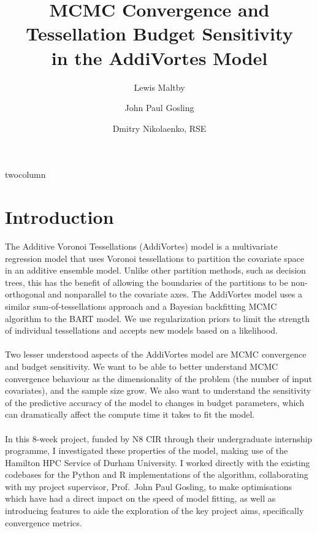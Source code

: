 \documentclass[10pt]{article}
\title{\Large\bfseries MCMC Convergence and Tessellation Budget Sensitivity\\
in the AddiVortes Model}
\author{Lewis Maltby}
\author{John Paul Gosling}
\author{Dmitry Nikolaenko, RSE}
\affil{Durham University, Durham, United Kingdom}
\date{}
\begin{document}
\csname twocolumn\endcsname[
    \begin{@twocolumnfalse}
        \maketitle
    \end{@twocolumnfalse}
]
\section{Introduction}
The Additive Voronoi Tessellations (AddiVortes) model is a multivariate regression model that uses Voronoi tessellations to partition the covariate space in an additive ensemble model. Unlike other partition methods, such as decision trees, this has the benefit of allowing the boundaries of the partitions to be non-orthogonal and nonparallel to the covariate axes. The AddiVortes model uses a similar sum-of-tessellations approach and a Bayesian backfitting MCMC algorithm to the BART model. We use regularization priors to limit the strength of individual tessellations and accepts new models based on a likelihood.\cite{main-paper}
\\\\
Two lesser understood aspects of the AddiVortes model are MCMC convergence and budget sensitivity. We want to be able to better understand MCMC convergence behaviour as the dimensionality of the problem (the number of input covariates), and the sample size grow. We also want to understand the sensitivity of the predictive accuracy of the model to changes in budget parameters, which can dramatically affect the compute time it takes to fit the model.
\\\\
In this 8-week project, funded by N8 CIR through their undergraduate internship programme, I investigated these properties of the model, making use of the Hamilton HPC Service of Durham University. I worked directly with the existing codebases for the Python and R implementations of the algorithm, collaborating with my project supervisor, Prof.\ John Paul Gosling, to make optimisations which have had a direct impact on the speed of model fitting, as well as introducing features to aide the exploration of the key project aims, specifically convergence metrics.
\end{document}
